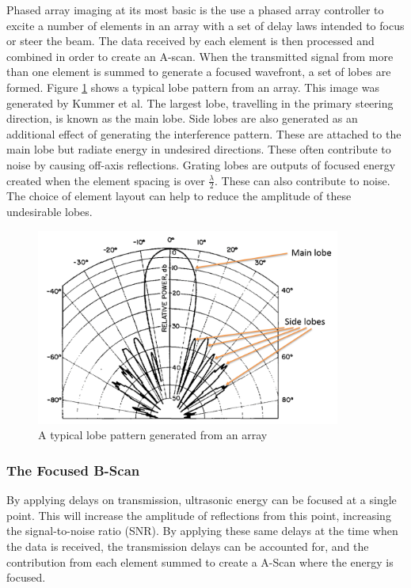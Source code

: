 Phased array imaging at its most basic is the use a phased array controller to excite a number of elements in an array with a set of delay laws intended to focus or steer the beam. The data received by each element is then processed and combined in order to create an A-scan. When the transmitted signal from more than one element is summed to generate a focused wavefront, a set of lobes are formed\cite{smith_High-speed_1991}. Figure \ref{fig:review_lobes} shows a typical lobe pattern from an array. This image was generated by Kummer et al\cite{kummer_ultra-low_1963}. The largest lobe, travelling in the primary steering direction, is known as the main lobe. Side lobes are also generated as an additional effect of generating the interference pattern. These are attached to the main lobe but radiate energy in undesired directions. These often contribute to noise by causing off-axis reflections. Grating lobes are outputs of focused energy created when the element spacing is over $\frac{\lambda}{2}$. These can also contribute to noise. The choice of element layout can help to reduce the amplitude of these undesirable lobes\cite{harrington_sidelobe_1961}.

\begin{figure}[htbp]
\centering
		\includegraphics[width=100mm]{Lobes2.png}
		\caption{A typical lobe pattern generated from an array}
		\label{fig:review_lobes}
\end{figure}

\subsubsection{The Focused B-Scan}

By applying delays on transmission, ultrasonic energy can be focused at a single point. This will increase the amplitude of reflections from this point, increasing the signal-to-noise ratio\cite{long_ultrasonic_2012} (SNR). By applying these same delays at the time when the data is received, the transmission delays can be accounted for, and the contribution from each element summed to create a A-Scan where the energy is focused.

